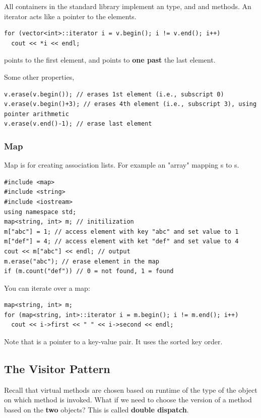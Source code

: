 \documentclass[english, 11pt]{article}
\begin{document}
All containers in the standard library implement an  type, and  and  methods. An iterator acts like a pointer to the elements.

\begin{lstlisting}
for (vector<int>::iterator i = v.begin(); i != v.end(); i++)
  cout << *i << endl;
\end{lstlisting}

 points to the first element, and  points to \textbf{one past} the last element.

Some other properties,
\begin{lstlisting}
v.erase(v.begin()); // erases 1st element (i.e., subscript 0)
v.erase(v.begin()+3); // erases 4th element (i.e., subscript 3), using pointer arithmetic
v.erase(v.end()-1); // erase last element
\end{lstlisting}

\subsubsection{Map}

Map is for creating association lists. For example an "array" mapping s to s.
\begin{lstlisting}
#include <map>
#include <string>
#include <iostream>
using namespace std;
map<string, int> m; // initilization
m["abc"] = 1; // access element with key "abc" and set value to 1
m["def"] = 4; // access element with ket "def" and set value to 4
cout << m["abc"] << endl; // output
m.erase("abc"); // erase element in the map
if (m.count("def")) // 0 = not found, 1 = found
\end{lstlisting}

You can iterate over a map:

\begin{lstlisting}
map<string, int> m;
for (map<string, int>::iterator i = m.begin(); i != m.end(); i++)
  cout << i->first << " " << i->second << endl;
\end{lstlisting}
Note that  is a pointer to a key-value pair. It uses the sorted key order.

\subsection{The Visitor Pattern}

Recall that virtual methods are chosen based on runtime of the type of the object on which method is invoked. What if we need to choose the version of a method based on the \textbf{two} objects? This is called \textbf{double dispatch}.
\end{document}
